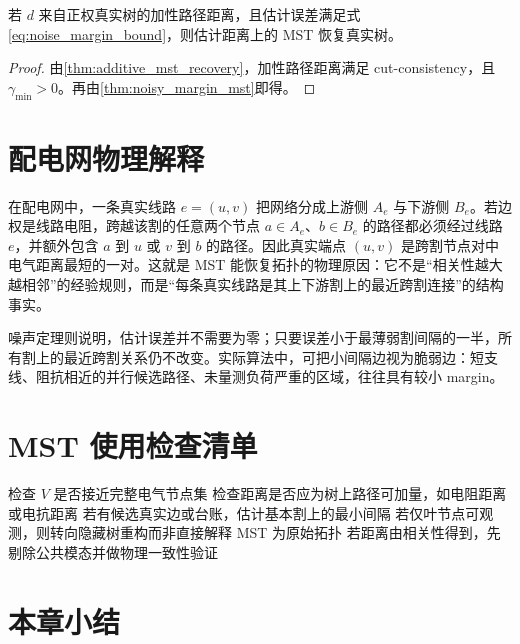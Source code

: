\begin{corollary}[加性距离的可恢复噪声半径]
\label{cor:additive_noise_radius}
若 $d$ 来自正权真实树的加性路径距离，且估计误差满足式\eqref{eq:noise_margin_bound}，则估计距离上的 MST 恢复真实树。
\end{corollary}

\begin{proof}
由\cref{thm:additive_mst_recovery}，加性路径距离满足 cut-consistency，且 $\gamma_{\min}>0$。再由\cref{thm:noisy_margin_mst}即得。
\end{proof}

\section{配电网物理解释}

在配电网中，一条真实线路 $e=(u,v)$ 把网络分成上游侧 $A_e$ 与下游侧 $B_e$。若边权是线路电阻，跨越该割的任意两个节点 $a\in A_e$、$b\in B_e$ 的路径都必须经过线路 $e$，并额外包含 $a$ 到 $u$ 或 $v$ 到 $b$ 的路径。因此真实端点 $(u,v)$ 是跨割节点对中电气距离最短的一对。这就是 MST 能恢复拓扑的物理原因：它不是“相关性越大越相邻”的经验规则，而是“每条真实线路是其上下游割上的最近跨割连接”的结构事实。

噪声定理则说明，估计误差并不需要为零；只要误差小于最薄弱割间隔的一半，所有割上的最近跨割关系仍不改变。实际算法中，可把小间隔边视为脆弱边：短支线、阻抗相近的并行候选路径、未量测负荷严重的区域，往往具有较小 margin。

\section{MST 使用检查清单}

\begin{algorithm}[htbp]
  \caption{MST 拓扑恢复的理论检查流程}
  \label{alg:mst_checklist}
  检查 $V$ 是否接近完整电气节点集\;
  检查距离是否应为树上路径可加量，如电阻距离或电抗距离\;
  若有候选真实边或台账，估计基本割上的最小间隔\;
  若仅叶节点可观测，则转向隐藏树重构而非直接解释 MST 为原始拓扑\;
  若距离由相关性得到，先剔除公共模态并做物理一致性验证\;
\end{algorithm}

\section{本章小结}

